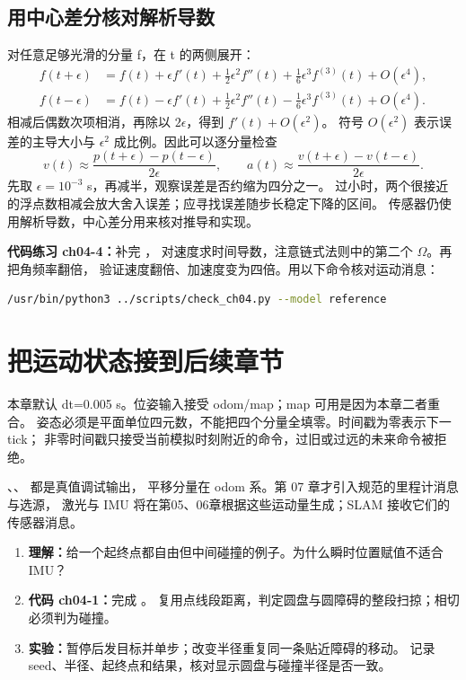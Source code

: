 \subsection*{用中心差分核对解析导数}
对任意足够光滑的分量 f，在 t 的两侧展开：
\begin{align}
f(t+\epsilon)&=f(t)+\epsilon f'(t)+\tfrac12\epsilon^2f''(t)
 +\tfrac16\epsilon^3f^{(3)}(t)+O(\epsilon^4),\\
f(t-\epsilon)&=f(t)-\epsilon f'(t)+\tfrac12\epsilon^2f''(t)
 -\tfrac16\epsilon^3f^{(3)}(t)+O(\epsilon^4).
\end{align}
相减后偶数次项相消，再除以 $2\epsilon$，得到 $f'(t)+O(\epsilon^2)$。
符号 $O(\epsilon^2)$ 表示误差的主导大小与 $\epsilon^2$ 成比例。因此可以逐分量检查
\begin{equation}
v(t)\approx\frac{p(t+\epsilon)-p(t-\epsilon)}{2\epsilon},\qquad
 a(t)\approx\frac{v(t+\epsilon)-v(t-\epsilon)}{2\epsilon}.
\end{equation}
先取 $\epsilon=10^{-3}$ s，再减半，观察误差是否约缩为四分之一。
过小时，两个很接近的浮点数相减会放大舍入误差；应寻找误差随步长稳定下降的区间。
传感器仍使用解析导数，中心差分用来核对推导和实现。

\textbf{代码练习 ch04-4：}补完 ，
对速度求时间导数，注意链式法则中的第二个 $\Omega$。再把角频率翻倍，
验证速度翻倍、加速度变为四倍。用以下命令核对运动消息：
\begin{lstlisting}[language=bash,numbers=none]
/usr/bin/python3 ../scripts/check_ch04.py --model reference
\end{lstlisting}

\section{把运动状态接到后续章节}
本章默认 dt=0.005 s。位姿输入接受 odom/map；map 可用是因为本章二者重合。
姿态必须是平面单位四元数，不能把四个分量全填零。时间戳为零表示下一 tick；
非零时间戳只接受当前模拟时刻附近的命令，过旧或过远的未来命令被拒绝。

、、 都是真值调试输出，
平移分量在 odom 系。第 07 章才引入规范的里程计消息与选源，
激光与 IMU 将在第05、06章根据这些运动量生成；SLAM 接收它们的传感器消息。

\begin{enumerate}
\item \textbf{理解：}给一个起终点都自由但中间碰撞的例子。为什么瞬时位置赋值不适合 IMU？
\item \textbf{代码 ch04-1：}完成 。
复用点线段距离，判定圆盘与圆障碍的整段扫掠；相切必须判为碰撞。
\item \textbf{实验：}暂停后发目标并单步；改变半径重复同一条贴近障碍的移动。
记录 seed、半径、起终点和结果，核对显示圆盘与碰撞半径是否一致。
\end{enumerate}

